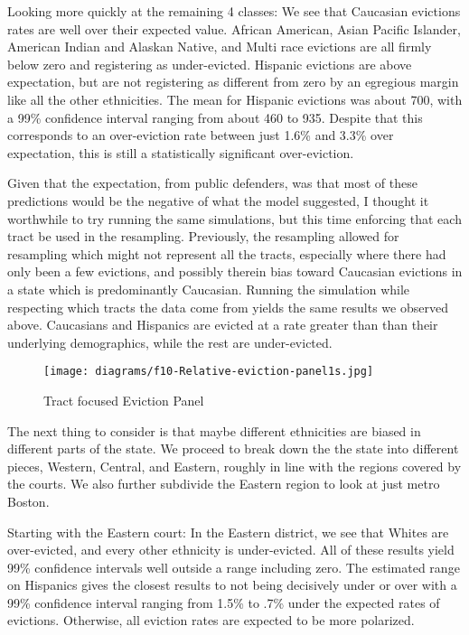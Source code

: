 \par Looking more quickly at the remaining 4 classes:  We see that Caucasian evictions rates are well over their expected value.  African American, Asian Pacific Islander, American Indian and Alaskan Native, and Multi race evictions are all firmly below zero and registering as under-evicted.  Hispanic evictions are above expectation, but are not registering as different from zero by an egregious margin like all the other ethnicities.  The mean for Hispanic evictions was about 700, with a 99\% confidence interval ranging from about 460 to 935.  Despite that this corresponds to an over-eviction rate between just 1.6\% and 3.3\% over expectation, this is still a statistically significant over-eviction.

Given that the expectation, from public defenders, was that most of these predictions would be the negative of what the model suggested, I thought it worthwhile to try running the same simulations, but this time enforcing that each tract be used in the resampling.  Previously, the resampling allowed for resampling which might not represent all the tracts, especially where there had only been a few evictions, and possibly therein bias toward Caucasian evictions in a state which is predominantly Caucasian.  Running the simulation while respecting which tracts the data come from yields the same results we observed above.  Caucasians and Hispanics are evicted at a rate greater than than their underlying demographics, while the rest are under-evicted.

\begin{figure}
  \begin{center}
    \texttt{[image: diagrams/f10-Relative-eviction-panel1s.jpg]}
  \end{center}
  \caption{Tract focused Eviction Panel}
\label{fig:figure10}
\end{figure}

\par The next thing to consider is that maybe different ethnicities are biased in different parts of the state.  We proceed to break down the the state into different pieces, Western, Central, and Eastern, roughly in line with the regions covered by the courts.  We also further subdivide the Eastern region to look at just metro Boston.

\par Starting with the Eastern court:  In the Eastern district, we see that Whites are over-evicted, and every other ethnicity is under-evicted.  All of these results yield 99\% confidence intervals well outside a range including zero.  The estimated range on Hispanics gives the closest results to not being decisively under or over with a 99\% confidence interval ranging from 1.5\% to .7\% under the expected rates of evictions.  Otherwise, all eviction rates are expected to be more polarized.

